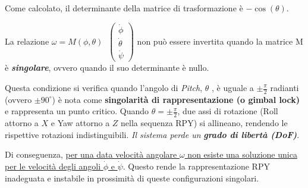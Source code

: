 \documentclass[11pt, a4paper]{article}
\begin{document}
\vspace{1em}
\begin{par}
\begin{flushleft}
Come calcolato, il determinante della matrice di trasformazione è $-\cos (\theta )$.
\end{flushleft}
\end{par}

\begin{par}
\begin{flushleft}
La relazione $\omega =M(\phi ,\theta )\;\;\left(\begin{array}{c}
\dot{\phi} \\
\dot{\theta} \\
\dot{\psi}
\end{array}\right)$ non può essere invertita quando la matrice M è \textit{\textbf{singolare}}, ovvero quando il suo determinante è nullo.
\end{flushleft}
\end{par}

\begin{par}
\begin{flushleft}
Questa condizione si verifica quando l'angolo di \textit{Pitch}, $\theta$ , è uguale a $\pm \frac{\pi }{2}$ radianti (ovvero $\pm 90^{\circ }$) è nota come \textbf{singolarità di rappresentazione (o gimbal lock)} e rappresenta un punto critico. Quando $\theta =\pm \frac{\pi }{2}$, due assi di rotazione (Roll attorno a $X$ e Yaw attorno a $Z$ nella sequenza RPY) si allineano, rendendo le rispettive rotazioni indistinguibili. \textit{Il sistema perde un }\textit{\textbf{grado di libertà (DoF)}}.
\end{flushleft}
\end{par}

\begin{par}
\begin{flushleft}
Di conseguenza, \underline{per una data velocità angolare $\omega$ non esiste una soluzione unica per le velocità degli angoli }$\dot{\phi}$\underline{ e }$\dot{\psi}$. Questo rende la rappresentazione RPY inadeguata e instabile in prossimità di queste configurazioni singolari.
\end{flushleft}
\end{par}
\end{document}
